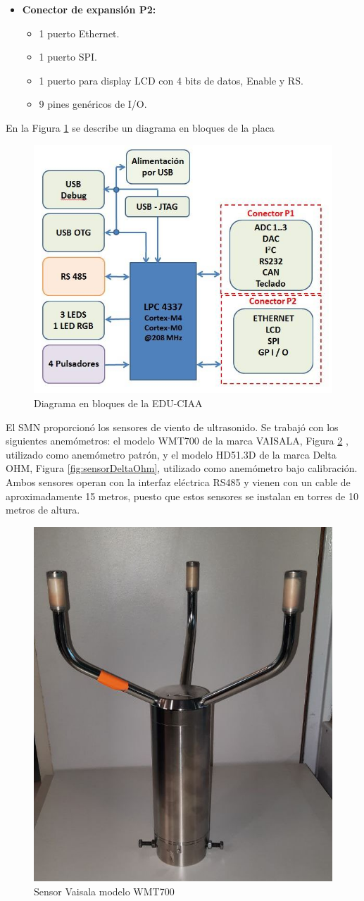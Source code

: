 \begin{itemize}[leftmargin=*]
  \item \textbf{Conector de expansión P2:}
    \begin{itemize}[label=-]
      \item 1 puerto Ethernet.
      \item 1 puerto SPI.
      \item 1 puerto para display LCD con 4 bits de datos, Enable y RS.
      \item 9 pines genéricos de I/O.
    \end{itemize}
    
\end{itemize}
En la Figura \ref{fig:EDU_CIAA_esquema} se describe un diagrama en bloques de la placa
\begin{figure}[H]
    \centering
    \includegraphics[width=0.7\linewidth]{Figuras/datalogger/Hardware/EDUCIAAesquema.png}
    \caption{Diagrama en bloques de la EDU-CIAA}
    \label{fig:EDU_CIAA_esquema}
\end{figure}

El SMN proporcionó los sensores de viento de ultrasonido. Se trabajó con los siguientes anemómetros: el modelo WMT700 de la marca VAISALA, Figura \ref{fig:sensorVaisala}
, utilizado como anemómetro patrón, y el modelo HD51.3D de la marca Delta OHM, Figura \ref{fig:sensorDeltaOhm}, utilizado como anemómetro bajo calibración. Ambos sensores operan con la interfaz eléctrica RS485 y vienen con un cable de aproximadamente 15 metros, puesto que estos sensores se instalan en torres de 10 metros de altura.

\begin{figure}[H]
    \centering
    \includegraphics[width=0.4\linewidth]{Figuras/datalogger/Hardware/sensorVaisala.jpg}
    \caption{Sensor Vaisala modelo WMT700}
    \label{fig:sensorVaisala}
\end{figure}


